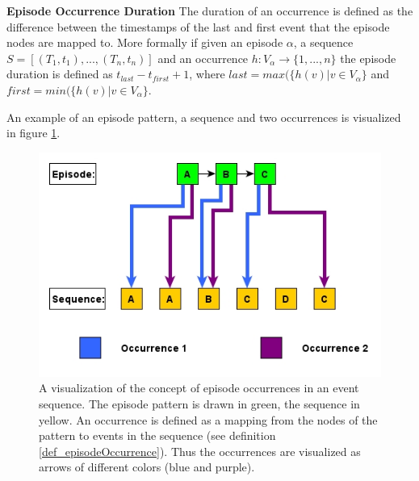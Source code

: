\begin{mydef}
\label{def_episodeOccurrence}
\textbf{Episode Occurrence Duration} The duration of an occurrence is defined as the difference between the timestamps of the last and first event that the episode nodes are mapped to. More formally if given an episode $\alpha$, a sequence $S=[(T_1,t_1),...,(T_n,t_n)]$ and an occurrence $h:V_\alpha \rightarrow \{1,...,n\}$ the episode duration is defined as $t_{last} - t_{first}+1$, where $last = max( \{h(v)| v \in V_\alpha \}$ and $first = min( \{h(v)| v \in V_\alpha \}$.
\end{mydef}

An example of an episode pattern, a sequence and two occurrences is visualized in figure \ref{fig_occurrenceExample}.

\begin{figure}[h]
	\centering
  	\includegraphics[width=\textwidth]{occurrenceExample}
	\caption{A visualization of the concept of episode occurrences in an event sequence. The episode pattern is drawn in green, the sequence in yellow. An occurrence is defined as a mapping from the nodes of the pattern to events in the sequence (see definition \ref{def_episodeOccurrence}). Thus the occurrences are visualized as arrows of different colors (blue and purple). }
	\label{fig_occurrenceExample}
\end{figure}


